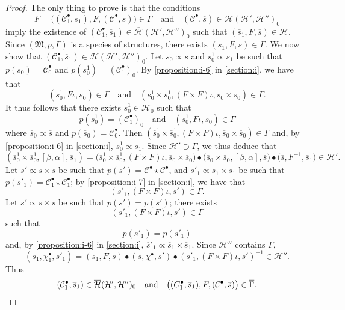 \documentclass[a4paper,fleqn]{article}
\theoremstyle{plain}
\theoremstyle{definition}
\newcommand{\textand}{\quad\text{and}\quad}
\newcommand{\CC}{\mathcal{C}}
\newcommand{\HH}{\mathcal{H}}
\newcommand{\bHH}{\overline{\HH}}
\newcommand{\MM}{\mathfrak{M}}
\newcommand{\subs}{\mathrel{\propto}}
\begin{document}
\begin{proof}
  The only thing to prove is that the conditions
  \[
    \overline{F}
    = \big((\CC_1^\bullet,s_1),F,(\CC^\bullet,s)\big)
    \in\overline{\Gamma}
    \textand
    (\CC^\bullet,\overline{s})
    \in\bHH(\HH',\HH'')_0
  \]
  imply the existence of $(\CC_1^\bullet,\overline{s}_1)\in\bHH(\HH',\HH'')_0$ such that $(\overline{s}_1,F,\overline{s})\in\HH$.
  Since $(\MM,p,\Gamma)$ is a species of structures, there exists $(\overline{s}_1,F,\overline{s})\in\Gamma$.
  We now show that $(\CC_1^\bullet,\overline{s}_1)\in\bHH(\HH',\HH'')_0$.
  Let $s_0\subs s$ and $s_0^1\subs s_1$ be such that $p(s_0)=\CC_0^\bullet$ and $p(s_0^1)=(\CC_1^\bullet)_0$.
  By \cref{proposition:i-6} in \cref{section:i}, we have that
  \[
    (s_0^1,F\iota,s_0)
    \in\Gamma
    \textand
    (s_0^1\times s_0^1,(F\times F)\iota,s_0\times s_0)
    \in\Gamma.
  \]
  It thus follows that there exists $\overline{s}_0^1\in\HH_0$ such that
  \[
    p(\overline{s}_0^1)
    = (\CC_1^\bullet)_0
    \textand
    (\overline{s}_0^1,F\iota,\overline{s}_0)
    \in\Gamma
  \]
  where $\overline{s}_0\subs\overline{s}$ and $p(\overline{s}_0)=\CC_0^\bullet$.
  Then $(\overline{s}_0^1\times\overline{s}_0^1,(F\times F)\iota,\overline{s}_0\times\overline{s}_0)\in\Gamma$ and, by \cref{proposition:i-6} in \cref{section:i}, $\overline{s}_0^1\subs\overline{s}_1$.
  Since $\HH'\supset\Gamma$, we thus deduce that
  \[
    (\overline{s}_0^1\times\overline{s}_0^1,[\beta,\alpha],\overline{s}_1)
    = \big(
      \overline{s}_0^1\times\overline{s}_0^1, (F\times F)\iota, \overline{s}_0\times\overline{s}_0
    \big)
    \bullet \big(
      \overline{s}_0\times\overline{s}_0, [\beta,\alpha], \overline{s}
    \big)
    \bullet \big(
      \overline{s}, F^{-1}, \overline{s}_1
    \big)
    \in \HH'.
  \]
  Let $s'\subs s\times s$ be such that $p(s')=\CC^\bullet\star\CC^\bullet$, and $s'_1\subs s_1\times s_1$ be such that $p(s'_1)=\CC_1^\bullet\star\CC_1^\bullet$;
  by \cref{proposition:i-7} in \cref{section:i}, we have that
  \[
    (s'_1,(F\times F)\iota,s')
    \in\Gamma.
  \]
  Let $\overline{s}'\subs\overline{s}\times\overline{s}$ be such that $p(\overline{s}')=p(s')$;
  there exists
  \[
    (\overline{s}'_1,(F\times F)\iota,\overline{s}')
    \in\Gamma
  \]
  such that
  \[
    p(\overline{s}'_1)
    = p(s'_1)
  \]
  and, by \cref{proposition:i-6} in \cref{section:i}, $\overline{s}'_1\subs\overline{s}_1\times\overline{s}_1$.
  Since $\HH''$ contains $\Gamma$,
  \[
    (\overline{s}_1,\chi_1^\bullet,\overline{s}'_1)
    = (\overline{s}_1,F,\overline{s})
    \bullet (\overline{s},\chi^\bullet,\overline{s}')
    \bullet(\overline{s}'_1,(F\times F)\iota,\overline{s}')^{-1}
    \in\HH''.
  \]
  Thus
  \[
    (\CC_1^\bullet,\overline{s}_1)
    \in\bHH(\HH',\HH'')_0
    \textand
    \big(
      (C_1^\bullet,\overline{s}_1), F, (\CC^\bullet,\overline{s})
    \big)
    \in\overline{\Gamma}.
    \qedhere
  \]
\end{proof}
\end{document}
